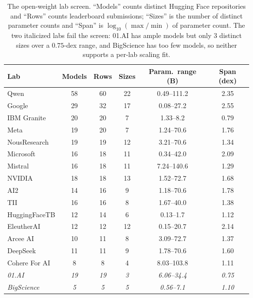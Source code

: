 \begin{table}[t]
    \centering
    \begin{tabular}{lccccc}
        \toprule
        Lab & Models & Rows & Sizes & Param.\ range (B) & Span (dex) \\
        \midrule
        Qwen           & 58 & 60 & 22 & 0.49--111.2 & 2.35 \\
        Google         & 29 & 32 & 17 & 0.08--27.2  & 2.55 \\
        IBM Granite    & 20 & 20 &  7 & 1.33--8.2   & 0.79 \\
        Meta           & 19 & 20 &  7 & 1.24--70.6  & 1.76 \\
        NousResearch   & 19 & 19 & 12 & 3.21--70.6  & 1.34 \\
        Microsoft      & 16 & 18 & 11 & 0.34--42.0  & 2.09 \\
        Mistral        & 16 & 18 & 11 & 7.24--140.6 & 1.29 \\
        NVIDIA         & 18 & 18 & 13 & 1.52--72.7  & 1.68 \\
        AI2            & 14 & 16 &  9 & 1.18--70.6  & 1.78 \\
        TII            & 16 & 16 &  8 & 1.67--40.0  & 1.38 \\
        HuggingFaceTB  & 12 & 14 &  6 & 0.13--1.7   & 1.12 \\
        EleutherAI     & 12 & 12 & 12 & 0.15--20.7  & 2.14 \\
        Arcee AI       & 10 & 11 &  8 & 3.09--72.7  & 1.37 \\
        DeepSeek       & 11 & 11 &  9 & 1.78--70.6  & 1.60 \\
        Cohere For AI  &  8 &  8 &  4 & 8.03--103.8 & 1.11 \\
        \midrule
        \textit{01.AI}       & \textit{19} & \textit{19} & \textit{3} & \textit{6.06--34.4} & \textit{0.75} \\
        \textit{BigScience}  &  \textit{5} &  \textit{5} & \textit{5} & \textit{0.56--7.1}  & \textit{1.10} \\
        \bottomrule
    \end{tabular}
    \caption{The open-weight lab screen. ``Models'' counts distinct Hugging Face
    repositories and ``Rows'' counts leaderboard submissions; ``Sizes'' is the
    number of distinct parameter counts and ``Span'' is
    $\log_{10}(\max/\min)$ of parameter count. The two italicized labs fail the
    screen: 01.AI has ample models but only 3 distinct sizes over a $0.75$-dex
    range, and BigScience has too few models, so neither supports a per-lab
    scaling fit.}
    \label{tab:ollm_lab_screen}
\end{table}

